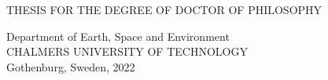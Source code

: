 \begin{titlepage}
  \begin{center}

    {\sc%
      THESIS FOR THE DEGREE OF DOCTOR OF PHILOSOPHY 
    }

    \vspace*{4cm}
    \Large{\textbf{\thetitle}}
    \normalsize

    
    \vspace{1.0cm}

    {\sc \theauthor}

    \ttlpage{}

    {
      Department of Earth, Space and Environment \\
      {\sc CHALMERS UNIVERSITY OF TECHNOLOGY}\\
      Gothenburg, Sweden, 2022 \\
    }

    
    
  \end{center}
\end{titlepage}
